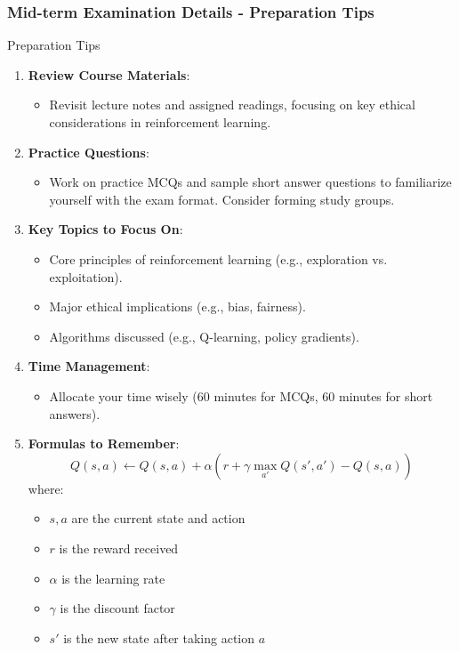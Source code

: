 \documentclass{beamer}
\begin{document}
\begin{frame}[fragile]
    \frametitle{Mid-term Examination Details - Preparation Tips}
    \begin{block}{Preparation Tips}
        \begin{enumerate}
            \item \textbf{Review Course Materials}:
                \begin{itemize}
                    \item Revisit lecture notes and assigned readings, focusing on key ethical considerations in reinforcement learning.
                \end{itemize}
            \item \textbf{Practice Questions}:
                \begin{itemize}
                    \item Work on practice MCQs and sample short answer questions to familiarize yourself with the exam format. Consider forming study groups.
                \end{itemize}
            \item \textbf{Key Topics to Focus On}:
                \begin{itemize}
                    \item Core principles of reinforcement learning (e.g., exploration vs. exploitation).
                    \item Major ethical implications (e.g., bias, fairness).
                    \item Algorithms discussed (e.g., Q-learning, policy gradients).
                \end{itemize}
            \item \textbf{Time Management}:
                \begin{itemize}
                    \item Allocate your time wisely (60 minutes for MCQs, 60 minutes for short answers).
                \end{itemize}
            \item \textbf{Formulas to Remember}:
                \begin{equation}
                    Q(s, a) \gets Q(s, a) + \alpha \left( r + \gamma \max_{a'} Q(s', a') - Q(s, a) \right)
                \end{equation}
                where:
                \begin{itemize}
                    \item $s, a$ are the current state and action
                    \item $r$ is the reward received
                    \item $\alpha$ is the learning rate
                    \item $\gamma$ is the discount factor
                    \item $s'$ is the new state after taking action $a$
                \end{itemize}
        \end{enumerate}
    \end{block}
\end{frame}
\end{document}

